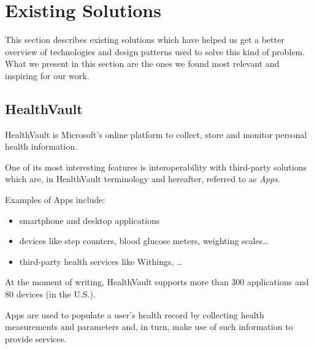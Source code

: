 
\section{Existing Solutions}
\label{section:existing-solutions}

This section describes existing solutions which have helped us get a better overview of technologies and design patterns used to solve this kind of problem.
What we present in this section are the ones we found most relevant and inspiring for our work.


\subsection{HealthVault} \nocite{HealthVault}

HealthVault is Microsoft's online platform to collect, store and monitor personal health
information. %

One of its most interesting features is interoperability with third-party solutions which are,
in HealthVault terminology and hereafter, referred to as \textit{Apps}.

Examples of Apps include:
\begin{itemize}
\item smartphone and desktop applications
\item devices like step counters, blood glucose meters, weighting scales\ldots
\item third-party health services like Withings, \ldots
\end{itemize}

At the moment of writing, HealthVault supports more than 300 applications and 80 devices
(in the U.S.).

Apps are used to populate a user's health record by collecting health measurements and parameters and, in turn, make use of such information to provide services.

